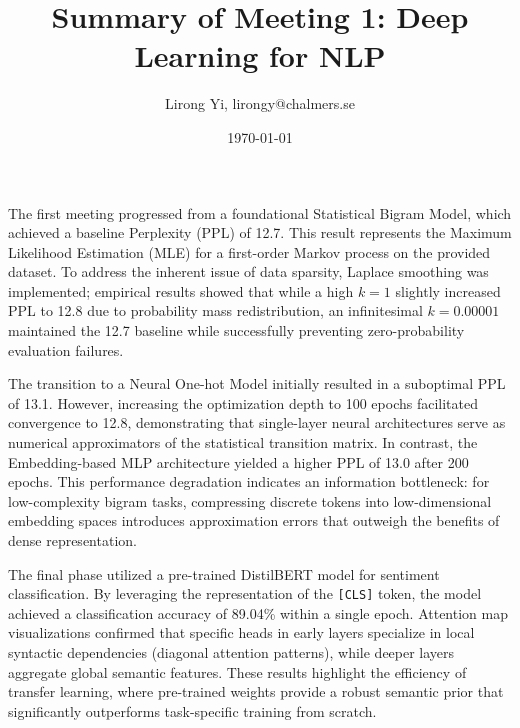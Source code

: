 \documentclass[11pt, a4paper]{article}
\title{\textbf{Summary of Meeting 1: Deep Learning for NLP}}
\author{Lirong Yi, lirongy@chalmers.se}
\date{\today}
\begin{document}
\maketitle

The first meeting progressed from a foundational Statistical Bigram Model, which achieved a baseline Perplexity (PPL) of 12.7. This result represents the Maximum Likelihood Estimation (MLE) for a first-order Markov process on the provided dataset. To address the inherent issue of data sparsity, Laplace smoothing was implemented; empirical results showed that while a high $k=1$ slightly increased PPL to 12.8 due to probability mass redistribution, an infinitesimal $k=0.00001$ maintained the 12.7 baseline while successfully preventing zero-probability evaluation failures.

The transition to a Neural One-hot Model initially resulted in a suboptimal PPL of 13.1. However, increasing the optimization depth to 100 epochs facilitated convergence to 12.8, demonstrating that single-layer neural architectures serve as numerical approximators of the statistical transition matrix. In contrast, the Embedding-based MLP architecture yielded a higher PPL of 13.0 after 200 epochs. This performance degradation indicates an information bottleneck: for low-complexity bigram tasks, compressing discrete tokens into low-dimensional embedding spaces introduces approximation errors that outweigh the benefits of dense representation.

The final phase utilized a pre-trained DistilBERT model for sentiment classification. By leveraging the representation of the \texttt{[CLS]} token, the model achieved a classification accuracy of 89.04\% within a single epoch. Attention map visualizations confirmed that specific heads in early layers specialize in local syntactic dependencies (diagonal attention patterns), while deeper layers aggregate global semantic features. These results highlight the efficiency of transfer learning, where pre-trained weights provide a robust semantic prior that significantly outperforms task-specific training from scratch.
\end{document}
